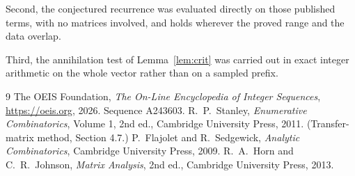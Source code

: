 \documentclass[11pt,a4paper]{article}
\theoremstyle{plain}
\theoremstyle{definition}
\begin{document}
Second, the conjectured recurrence was evaluated directly on those published terms, with no
matrices involved, and holds wherever the proved range and the data overlap.

Third, the annihilation test of Lemma~\ref{lem:crit} was carried out in exact integer
arithmetic on the whole vector rather than on a sampled prefix.

\begin{thebibliography}{9}
 The OEIS Foundation, \emph{The On-Line Encyclopedia of Integer
Sequences}, \url{https://oeis.org}, 2026. Sequence A243603.
 R.~P.~Stanley, \emph{Enumerative Combinatorics}, Volume 1, 2nd ed.,
Cambridge University Press, 2011. (Transfer-matrix method, Section 4.7.)
 P.~Flajolet and R.~Sedgewick, \emph{Analytic Combinatorics}, Cambridge
University Press, 2009.
 R.~A.~Horn and C.~R.~Johnson, \emph{Matrix Analysis}, 2nd ed., Cambridge
University Press, 2013.
\end{thebibliography}
\end{document}
